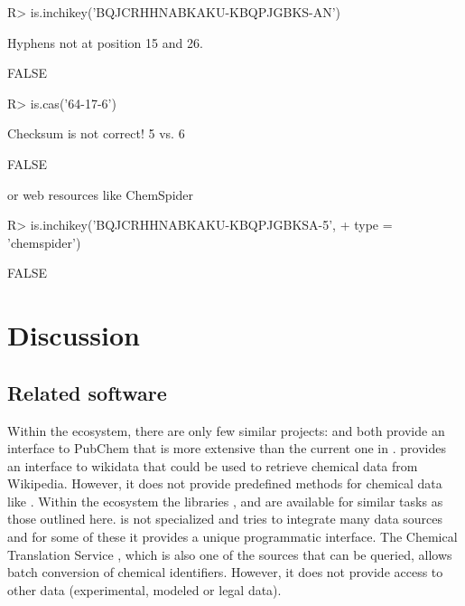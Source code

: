 \documentclass[article, shortnames]{jss}\usepackage[]{graphicx}\usepackage[]{color}
\begin{document}
\begin{CodeChunk}
\begin{CodeInput}
R> is.inchikey('BQJCRHHNABKAKU-KBQPJGBKS-AN')
\end{CodeInput}
\begin{CodeOutput}
Hyphens not at position 15 and 26.
\end{CodeOutput}
\begin{CodeOutput}
[1] FALSE
\end{CodeOutput}
\begin{CodeInput}
R> is.cas('64-17-6')
\end{CodeInput}
\begin{CodeOutput}
Checksum is not correct! 5 vs. 6
\end{CodeOutput}
\begin{CodeOutput}
[1] FALSE
\end{CodeOutput}
\end{CodeChunk}

or web resources like ChemSpider
\begin{CodeChunk}
\begin{CodeInput}
R> is.inchikey('BQJCRHHNABKAKU-KBQPJGBKSA-5', 
+    type = 'chemspider')
\end{CodeInput}
\begin{CodeOutput}
[1] FALSE
\end{CodeOutput}
\end{CodeChunk}

\section[Discussion]{Discussion}
\subsection[Related software]{Related software}
Within the  ecosystem, there are only few similar projects:
 \citep{rpubchem_2014} and  \citep{chemminer_2008} both provide an interface to PubChem that is more extensive than the current one in .
 \citep{wikidatar_2016} provides an interface to wikidata that could be used to retrieve chemical data from Wikipedia.
However, it does not provide predefined methods for chemical data like .
Within the  ecosystem the libraries  \citep{pubchempy},  \citep{chemspipy} and  \citep{cirpy} are available for similar tasks as those outlined here.
 is not specialized and tries to integrate many data sources and for some of these it provides a unique programmatic interface.
The Chemical Translation Service \citep{Wohlgemuth_Haldiya_Willighagen_Kind_Fiehn_2010}, which is also one of the sources that can be queried, allows batch conversion of chemical identifiers.
However, it does not provide access to other data (experimental, modeled or legal data).
\end{document}
